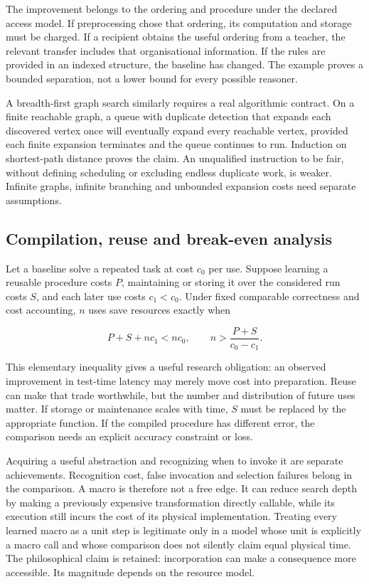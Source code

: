 \documentclass[
  11pt,
  a4paper,
]{article}
\begin{document}
The improvement belongs to the ordering and procedure under the declared
access model. If preprocessing chose that ordering, its computation and
storage must be charged. If a recipient obtains the useful ordering from
a teacher, the relevant transfer includes that organisational
information. If the rules are provided in an indexed structure, the
baseline has changed. The example proves a bounded separation, not a
lower bound for every possible reasoner.

A breadth-first graph search similarly requires a real algorithmic
contract. On a finite reachable graph, a queue with duplicate detection
that expands each discovered vertex once will eventually expand every
reachable vertex, provided each finite expansion terminates and the
queue continues to run. Induction on shortest-path distance proves the
claim. An unqualified instruction to be fair, without defining
scheduling or excluding endless duplicate work, is weaker. Infinite
graphs, infinite branching and unbounded expansion costs need separate
assumptions.

\subsection{Compilation, reuse and break-even
analysis}\label{compilation-reuse-and-break-even-analysis}

Let a baseline solve a repeated task at cost \(c_0\) per use. Suppose
learning a reusable procedure costs \(P\), maintaining or storing it
over the considered run costs \(S\), and each later use costs
\(c_1<c_0\). Under fixed comparable correctness and cost accounting,
\(n\) uses save resources exactly when

\[P+S+nc_1<nc_0,\qquad n>\frac{P+S}{c_0-c_1}.\]

This elementary inequality gives a useful research obligation: an
observed improvement in test-time latency may merely move cost into
preparation. Reuse can make that trade worthwhile, but the number and
distribution of future uses matter. If storage or maintenance scales
with time, \(S\) must be replaced by the appropriate function. If the
compiled procedure has different error, the comparison needs an explicit
accuracy constraint or loss.

Acquiring a useful abstraction and recognizing when to invoke it are
separate achievements. Recognition cost, false invocation and selection
failures belong in the comparison. A macro is therefore not a free edge.
It can reduce search depth by making a previously expensive
transformation directly callable, while its execution still incurs the
cost of its physical implementation. Treating every learned macro as a
unit step is legitimate only in a model whose unit is explicitly a macro
call and whose comparison does not silently claim equal physical time.
The philosophical claim is retained: incorporation can make a
consequence more accessible. Its magnitude depends on the resource
model.
\end{document}
